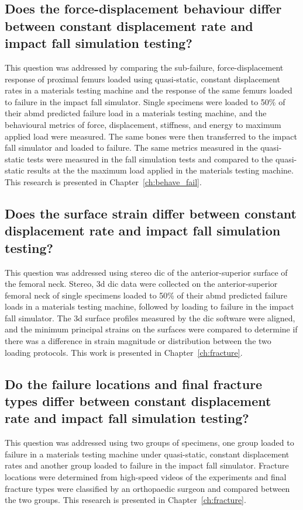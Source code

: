 \subsection[Force-displacement behaviour]{Does the force-displacement behaviour differ between constant displacement rate and impact fall simulation testing?}
\label{sec:intro_method_behave}
This question was addressed by comparing the sub-failure, force-displacement response of proximal femurs loaded using quasi-static, constant displacement rates in a materials testing machine and the response of the same femurs loaded to failure in the impact fall simulator.
Single specimens were loaded to 50\% of their \ac{abmd} predicted failure load in a materials testing machine, and the behavioural metrics of force, displacement, stiffness, and energy to maximum applied load were measured.
The same bones were then transferred to the impact fall simulator and loaded to failure.
The same metrics measured in the quasi-static tests were measured in the fall simulation tests and compared to the quasi-static results at the the maximum load applied in the materials testing machine.
This research is presented in Chapter~\ref{ch:behave_fail}.

\subsection[Strain behaviour]{Does the surface strain differ between constant displacement rate and impact fall simulation testing?}
\label{sec:intro_method_fail}
This question was addressed using stereo \acf{dic} of the anterior-superior surface of the femoral neck. %
Stereo, \ac{3d} \ac{dic} data were collected on the anterior-superior femoral neck of single specimens loaded to 50\% of their \ac{abmd} predicted failure loads in a materials testing machine, followed by loading to failure in the impact fall simulator.
The \ac{3d} surface profiles measured by the \ac{dic} software were aligned, and the minimum principal strains on the surfaces were compared to determine if there was a difference in strain magnitude or distribution between the two loading protocols.
This work is presented in Chapter~\ref{ch:fracture}.

\subsection[Failure behaviour]{Do the failure locations and final fracture types differ between constant displacement rate and impact fall simulation testing?}
\label{sec:intro_method_fracture}
This question was addressed using two groups of specimens, one group loaded to failure in a materials testing machine under quasi-static, constant displacement rates and another group loaded to failure in the impact fall simulator.
Fracture locations were determined from high-speed videos of the experiments and final fracture types were classified by an orthopaedic surgeon and compared between the two groups.
This research is presented in Chapter~\ref{ch:fracture}.